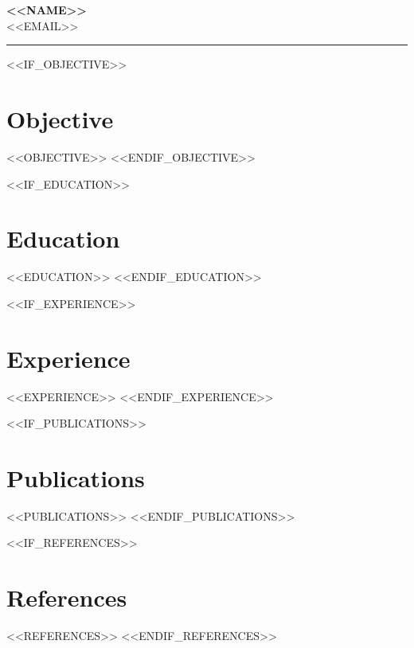 \documentclass{article}
\begin{document}
\begin{center}
\Huge\textbf{<<NAME>>}\\
\normalsize <<EMAIL>>
\end{center}
\hrule
\vspace{1em}

<<IF_OBJECTIVE>>
\section*{Objective}
<<OBJECTIVE>>
<<ENDIF_OBJECTIVE>>

<<IF_EDUCATION>>
\section*{Education}
<<EDUCATION>>
<<ENDIF_EDUCATION>>

<<IF_EXPERIENCE>>
\section*{Experience}
<<EXPERIENCE>>
<<ENDIF_EXPERIENCE>>

<<IF_PUBLICATIONS>>
\section*{Publications}
<<PUBLICATIONS>>
<<ENDIF_PUBLICATIONS>>

<<IF_REFERENCES>>
\section*{References}
<<REFERENCES>>
<<ENDIF_REFERENCES>>
\end{document}

